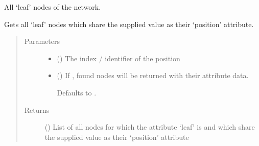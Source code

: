 \documentclass[letterpaper,10pt,english]{sphinxmanual}
\begin{document}
\begin{fulllineitems}
\begin{fulllineitems}
\begin{quote}
\begin{description}
\end{description}\end{quote}

\end{fulllineitems}


\begin{fulllineitems}
\label{\detokenize{cockatoo:cockatoo.KnitNetworkBase.leaf_nodes}}
All ‘leaf’ nodes of the network.

\end{fulllineitems}


\begin{fulllineitems}
\label{\detokenize{cockatoo:cockatoo.KnitNetworkBase.leaves_on_position}}
Gets all ‘leaf’ nodes which share the supplied value as their ‘position’
attribute.
\begin{quote}\begin{description}
\item[{Parameters}] \leavevmode\begin{itemize}
\item {} 
 () \textendash{} The index / identifier of the position

\item {} 
 (\sphinxstyleliteralemphasis{\sphinxupquote{, }}) \textendash{} 
If , found nodes will be returned with their attribute data.

Defaults to .


\end{itemize}

\item[{Returns}] \leavevmode
{} () \textendash{} List of all nodes for which the attribute ‘leaf’ is  and
which share the supplied value as their ‘position’ attribute


\end{description}
\end{quote}
\end{fulllineitems}
\end{fulllineitems}
\end{document}
